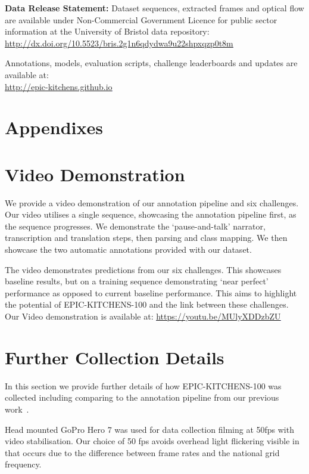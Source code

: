 \RequirePackage{amsmath} \documentclass[runningheads]{llncs}
\newcommand{\chParagraph}[1]{\noindent {\textbf{#1.}} \hspace{6pt}}
\newcommand {\newDataset} {EPIC-KITCHENS-100}
\begin{document}
\noindent \textbf{Data Release Statement:}
Dataset sequences, extracted frames and optical flow are available under Non-Commercial Government Licence for public sector information at the University of Bristol data repository:\\
\textcolor{blue}{\underline{\url{http://dx.doi.org/10.5523/bris.2g1n6qdydwa9u22shpxqzp0t8m}}}

\noindent Annotations, models, evaluation scripts, challenge leaderboards and updates are available at:\\ \textcolor{blue}{\underline{\url{http://epic-kitchens.github.io}}}




\newpage
\section*{Appendixes}
\appendix

\section{Video Demonstration}
We provide a video demonstration of our annotation pipeline and six challenges.
Our video utilises a single sequence, showcasing the annotation pipeline first, as the sequence progresses.
We demonstrate the `pause-and-talk' narrator, transcription and translation steps, then parsing and class mapping.
We then showcase the two automatic annotations provided with our dataset.

The video demonstrates predictions from our six challenges. 
This showcases baseline results, but on a training sequence demonstrating `near perfect' performance as opposed to current baseline performance.
This aims to highlight the potential of \newDataset{} and the link between these challenges. Our Video demonstration is available at: \textcolor{blue}{\underline{\url{https://youtu.be/MUlyXDDzbZU}}}

\section{Further Collection Details}
\label{app:sectionB}

In this section we provide further details of how \newDataset{} was collected including comparing to the annotation pipeline from our previous work~\cite{Damen2018EPICKITCHENS}.

\chParagraph{Camera Settings for Collection}
Head mounted GoPro Hero 7 was used for data collection filming at 50fps with video stabilisation. 
Our choice of 50 fps avoids overhead light flickering visible in~\cite{Damen2018EPICKITCHENS} that occurs due to the difference between frame rates and the national grid frequency.
\end{document}
